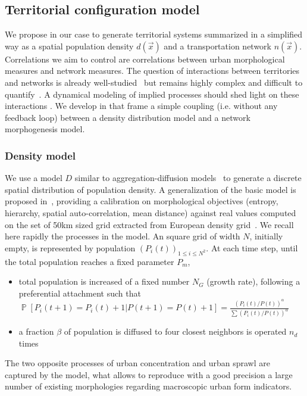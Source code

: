 \documentclass{bmcart}
\DeclareMathOperator{\Proba}{\mathbb{P}}
\newcommand{\Pb}[1]{\ensuremath{\Proba\!\left[#1\right]}}
\begin{document}
\subsection*{Territorial configuration model}

We propose in our case to generate territorial systems summarized in a simplified way as a spatial population density $d(\vec{x})$ and a transportation network $n(\vec{x})$. Correlations we aim to control are correlations between urban morphological measures and network measures. The question of interactions between territories and networks is already well-studied~\cite{offner1996reseaux} but remains highly complex and difficult to quantify~\cite{offner1993effets}. A dynamical modeling of implied processes should shed light on these interactions \cite{bretagnolle:tel-00459720}. We develop in that frame a simple coupling (i.e. without any feedback loop) between a density distribution model and a network morphogenesis model.




\subsubsection*{Density model}

We use a model $D$ similar to aggregation-diffusion models~\cite{batty2006hierarchy} to generate a discrete spatial distribution of population density. A generalization of the basic model is proposed in~\cite{raimbault2018calibration}, providing a calibration on morphological objectives (entropy, hierarchy, spatial auto-correlation, mean distance) against real values computed on the set of 50km sized grid extracted from European density grid~\cite{eurostat}. We recall here rapidly the processes in the model. An square grid of width $N$, initially empty, is represented by population $(P_i(t))_{1\leq i\leq N^2}$. At each time step, until the total population reaches a fixed parameter $P_m$,
\begin{itemize}
\item total population is increased of a fixed number $N_G$ (growth rate), following a preferential attachment such that $\Pb{P_i(t+1)=P_i(t)+1|P(t+1)=P(t)+1}=\frac{(P_i(t)/P(t))^{\alpha}}{\sum(P_i(t)/P(t))^{\alpha}}$
\item a fraction $\beta$ of population is diffused to four closest neighbors is operated $n_d$ times
\end{itemize}


The two opposite processes of urban concentration and urban sprawl are captured by the model, what allows to reproduce with a good precision a large number of existing morphologies regarding macroscopic urban form indicators.
\end{document}
